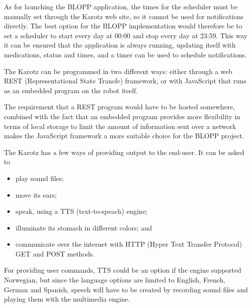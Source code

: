 As for launching the BLOPP application, the times for the scheduler must
be manually set through the Karotz web site, so it cannot be 
used for notifications directly. The best option for the BLOPP 
implementation would therefore be to set a scheduler to start
every day at 00:00 and stop every day at 23:59. This way it can
be ensured that the application is always running, updating
itself with medications, status and times, and a timer can be
used to schedule notifications.

The Karotz can be programmed in two different ways: either
through a web REST (Representational State Transfe) framework, 
or with JavaScript that runs as an embedded program on the robot itself.

The requirement that a REST program would have to be hosted
somewhere, combined with the fact that an embedded program 
provides more flexibility in terms of local storage to limit the
amount of information sent over a network makes the JavaScript
framework a more suitable choice for the BLOPP project.

The Karotz has a few ways of providing output to the end-user. It
can be asked to
\begin{itemize}
    \item play sound files;
    \item move its ears;
    \item speak, using a TTS (text-to-speach) engine;
    \item illuminate its stomach in different colors;
    and
    \item communicate over the internet with HTTP (Hyper Text Transfer Protocol) GET and POST 
          methods.
\end{itemize}

For providing user commands, TTS could be an option if the engine
supported Norwegian, but since the language options are limited to
English, French, German and Spanish, speech will have to be
created by recording sound files and playing them with the
multimedia engine.
